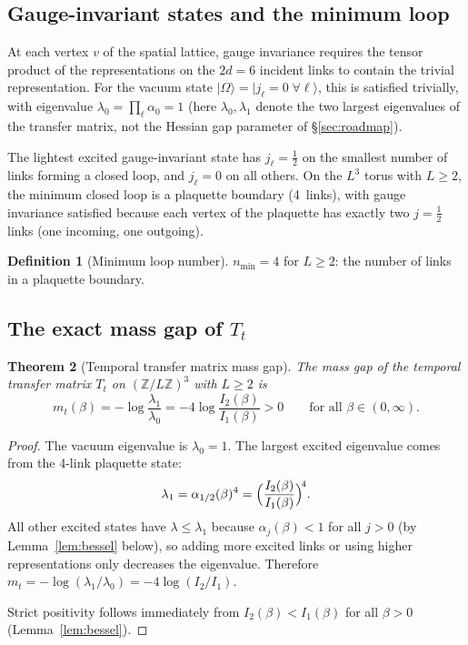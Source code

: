 \documentclass[11pt]{article}
\newtheorem{theorem}{Theorem}[section]
\theoremstyle{definition}
\newtheorem{definition}[theorem]{Definition}
\newcommand{\Z}{\mathbb{Z}}
\begin{document}
\subsection{Gauge-invariant states and the minimum loop}

At each vertex $v$ of the spatial lattice, gauge invariance requires
the tensor product of the representations on the $2d=6$ incident links
to contain the trivial representation.  For the vacuum state
$|\Omega\rangle=|j_\ell=0\;\forall\ell\rangle$, this is satisfied
trivially, with eigenvalue $\lambda_0=\prod_\ell\alpha_0=1$
(here $\lambda_0,\lambda_1$ denote the two largest eigenvalues of the
transfer matrix, not the Hessian gap parameter of \S\ref{sec:roadmap}).

The lightest excited gauge-invariant state has
$j_\ell=\frac{1}{2}$ on the smallest number of links forming a closed
loop, and $j_\ell=0$ on all others.  On the $L^3$ torus with $L\ge 2$,
the minimum closed loop is a plaquette boundary (4~links), with
gauge invariance satisfied because each vertex of the plaquette has
exactly two $j=\frac{1}{2}$ links (one incoming, one outgoing).

\begin{definition}[Minimum loop number]
$n_{\min}=4$ for $L\ge 2$: the number of links in a plaquette boundary.
\end{definition}

\subsection{The exact mass gap of $T_t$}

\begin{theorem}[Temporal transfer matrix mass gap]\label{thm:Tt}
The mass gap of the temporal transfer matrix $T_t$ on $(\Z/L\Z)^3$
with $L\ge 2$ is
\begin{equation}\label{eq:mTt}
m_t(\beta)=-\log\frac{\lambda_1}{\lambda_0}
=-4\log\frac{I_2(\beta)}{I_1(\beta)}>0
\qquad\text{for all }\beta\in(0,\infty).
\end{equation}
\end{theorem}

\begin{proof}
The vacuum eigenvalue is $\lambda_0=1$.  The largest excited eigenvalue
comes from the 4-link plaquette state:
\begin{equation}
\lambda_1=\alpha_{1/2}(\beta)^4=\Bigl(\frac{I_2(\beta)}{I_1(\beta)}\Bigr)^{\!4}.
\end{equation}
All other excited states have $\lambda\le\lambda_1$ because
$\alpha_j(\beta)<1$ for all $j>0$ (by Lemma~\ref{lem:bessel} below),
so adding more excited links or using higher representations only
decreases the eigenvalue.  Therefore
$m_t=-\log(\lambda_1/\lambda_0)=-4\log(I_2/I_1)$.

Strict positivity follows immediately from $I_2(\beta)<I_1(\beta)$
for all $\beta>0$ (Lemma~\ref{lem:bessel}).
\end{proof}
\end{document}
